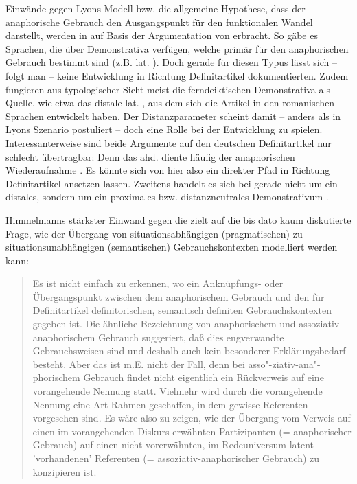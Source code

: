 Einwände gegen Lyons Modell bzw. die allgemeine Hypothese, dass der anaphorische Gebrauch den Ausgangspunkt für den funktionalen Wandel darstellt, werden in 
\textcite[527]{deMulder2011} auf Basis der Argumentation von \textcite[96-98]{Himmelmann1997} erbracht. So gäbe es Sprachen, die über Demonstrativa verfügen, welche primär für den anaphorischen Gebrauch bestimmt sind (z.B. lat. ). Doch gerade für diesen Typus lässt sich -- folgt man \textcite[98]{Himmelmann1997} -- keine Entwicklung in Richtung Definitartikel dokumentierten.  Zudem fungieren aus typologischer Sicht meist die ferndeiktischen Demonstrativa als Quelle, wie etwa das distale lat. , aus dem sich die Artikel in den romanischen Sprachen entwickelt haben. Der Distanzparameter scheint damit -- anders als in Lyons Szenario postuliert -- doch eine Rolle bei der Entwicklung zu spielen. Interessanterweise sind beide Argumente auf den deutschen Definitartikel nur schlecht übertragbar: Denn das ahd.  diente häufig der anaphorischen Wiederaufnahme  \parencite[z.B.][]{Jager1917, Jager1918,Oubouzar1992,Leiss2000}. Es könnte sich von hier also ein direkter Pfad in Richtung Definitartikel ansetzen lassen. Zweitens handelt es sich bei  gerade nicht um ein distales, sondern um ein proximales bzw. distanzneutrales Demonstrativum . 


Himmelmanns stärkster Einwand gegen die  zielt auf die bis dato kaum diskutierte Frage, wie der Übergang von situationsabhängigen (pragmatischen) zu situationsunabhängigen (semantischen) Gebrauchskontexten modelliert werden kann: \blockcquote[94]{Himmelmann1997}{Es ist nicht einfach zu erkennen, wo ein Anknüpfungs- oder Übergangspunkt zwischen dem anaphorischem Gebrauch und den für Definitartikel definitorischen, semantisch definiten Gebrauchskontexten gegeben ist. Die ähnliche Bezeichnung von anaphorischem und assoziativ-anaphorischem Gebrauch suggeriert, daß dies engverwandte Gebrauchsweisen sind und deshalb auch kein besonderer Erklärungsbedarf besteht. Aber das ist m.E. nicht der Fall, denn bei asso"-ziativ-ana"-phorischem Gebrauch findet nicht eigentlich ein Rückverweis auf eine
vorangehende Nennung statt. Vielmehr wird durch die vorangehende Nennung eine Art Rahmen geschaffen, in dem gewisse Referenten vorgesehen sind. 
Es wäre also zu zeigen, wie der Übergang vom Verweis auf einen
im vorangehenden Diskurs erwähnten Partizipanten (= anaphorischer Gebrauch) auf einen
nicht vorerwähnten, im Redeuniversum latent 'vorhandenen' Referenten (= assoziativ-anaphorischer Gebrauch) zu konzipieren ist.}

